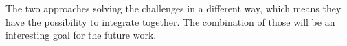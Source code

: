 \documentclass[article]{aaltoseries}
\begin{document}
The two approaches solving the challenges in a different way, which means they have the possibility to integrate together. 
The combination of those will be an interesting goal for the future work. 







\end{document}
